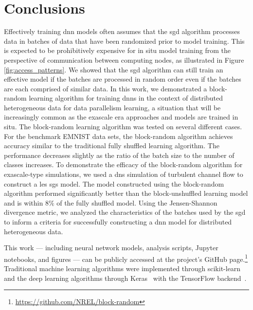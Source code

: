 \documentclass[review]{elsarticle}
\begin{document}
\section{Conclusions}\label{sec:ccl}

Effectively training \gls{dnn} models often assumes that the \gls{sgd}
algorithm processes data in batches of data that have been randomized
prior to model training. This is expected to be prohibitively
expensive for in situ model training from the perspective of
communication between computing nodes, as illustrated in
Figure\,\ref{fig:access_patterns}. We showed that the \gls{sgd}
algorithm can still train an effective model if the batches are
processed in random order even if the batches are each comprised of
similar data. In this work, we demonstrated a block-random learning
algorithm for training \glspl{dnn} in the context of distributed
heterogeneous data for data parallelism learning, a situation that
will be increasingly common as the exascale era approaches and models
are trained in situ. The block-random learning algorithm was tested on
several different cases. For the benchmark EMNIST data sets, the
block-random algorithm achieves accuracy similar to the traditional
fully shuffled learning algorithm. The performance decreases slightly
as the ratio of the batch size to the number of classes increases. To
demonstrate the efficacy of the block-random algorithm for
exascale-type simulations, we used a \gls{dns} simulation of turbulent
channel flow to construct a \gls{les} \gls{sgs} model. The model
constructed using the block-random algorithm performed significantly
better than the block-unshuffled learning model and is within $8\%$ of
the fully shuffled model. Using the Jensen-Shannon divergence metric,
we analyzed the characteristics of the batches used by the \gls{sgd}
to inform a criteria for successfully constructing a \gls{dnn} model
for distributed heterogeneous data.

This work --- including neural network models, analysis scripts,
Jupyter notebooks, and figures --- can be publicly accessed at the
project's GitHub
page.\footnote{\url{https://github.com/NREL/block-random}} Traditional
machine learning algorithms were implemented through
scikit-learn~\cite{Pedregosa2011} and the deep learning algorithms
through Keras~\cite{Chollet2015} with the TensorFlow
backend~\cite{tensorflow2015-whitepaper}.
\end{document}
